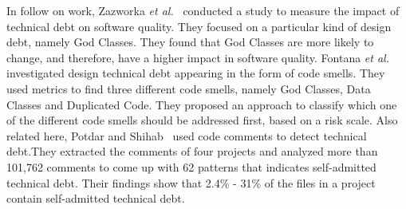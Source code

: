 In follow on work, Zazworka \textit{et al.}~\cite{Zazworka2011MTD} conducted a study to measure the impact of technical debt on software quality. They focused on a particular kind of design debt, namely God Classes. They found that God Classes are more likely to change, and therefore, have a higher impact in software quality. Fontana \textit{et al.}~\cite{Fontana2012MTD} investigated design technical debt appearing in the form of code smells. They used metrics to find three different code smells, namely God Classes, Data Classes and Duplicated Code. They proposed an approach to classify which one of the different code smells should be addressed first, based on a risk scale. Also related here, Potdar and Shihab~\cite{Potdar2014ICSME} used code comments to detect technical debt.They extracted the comments of four projects and analyzed more than 101,762 comments to come up with 62  patterns that indicates self-admitted technical debt. Their findings show that 2.4\% - 31\% of the files in a project contain self-admitted technical debt.



